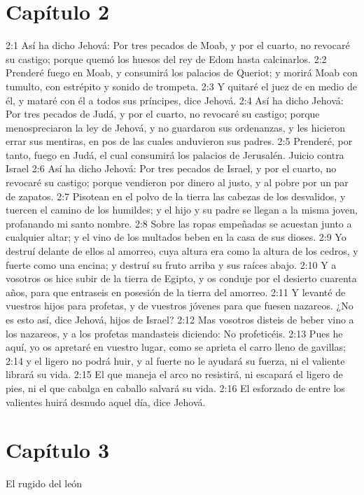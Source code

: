 \section*{Capítulo 2 } 
  
2:1 Así ha dicho Jehová: Por tres pecados de Moab, y por el cuarto, no revocaré su castigo; porque quemó los huesos del rey de Edom hasta calcinarlos.   
2:2 Prenderé fuego en Moab, y consumirá los palacios de Queriot; y morirá Moab con tumulto, con estrépito y sonido de trompeta.   
2:3 Y quitaré el juez de en medio de él, y mataré con él a todos sus príncipes, dice Jehová.   
2:4 Así ha dicho Jehová: Por tres pecados de Judá, y por el cuarto, no revocaré su castigo; porque menospreciaron la ley de Jehová, y no guardaron sus ordenanzas, y les hicieron errar sus mentiras, en pos de las cuales anduvieron sus padres.   
2:5 Prenderé, por tanto, fuego en Judá, el cual consumirá los palacios de Jerusalén.   
Juicio contra Israel   
2:6 Así ha dicho Jehová: Por tres pecados de Israel, y por el cuarto, no revocaré su castigo; porque vendieron por dinero al justo, y al pobre por un par de zapatos.   
2:7 Pisotean en el polvo de la tierra las cabezas de los desvalidos, y tuercen el camino de los humildes; y el hijo y su padre se llegan a la misma joven, profanando mi santo nombre.   
2:8 Sobre las ropas empeñadas se acuestan junto a cualquier altar; y el vino de los multados beben en la casa de sus dioses.   
2:9 Yo destruí delante de ellos al amorreo, cuya altura era como la altura de los cedros, y fuerte como una encina; y destruí su fruto arriba y sus raíces abajo.   
2:10 Y a vosotros os hice subir de la tierra de Egipto, y os conduje por el desierto cuarenta años, para que entraseis en posesión de la tierra del amorreo.   
2:11 Y levanté de vuestros hijos para profetas, y de vuestros jóvenes para que fuesen nazareos. ¿No es esto así, dice Jehová, hijos de Israel?   
2:12 Mas vosotros disteis de beber vino a los nazareos, y a los profetas mandasteis diciendo: No profeticéis.   
2:13 Pues he aquí, yo os apretaré en vuestro lugar, como se aprieta el carro lleno de gavillas;   
2:14 y el ligero no podrá huir, y al fuerte no le ayudará su fuerza, ni el valiente librará su vida.   
2:15 El que maneja el arco no resistirá, ni escapará el ligero de pies, ni el que cabalga en caballo salvará su vida.   
2:16 El esforzado de entre los valientes huirá desnudo aquel día, dice Jehová.   
\section*{Capítulo 3  }
El rugido del león   
  
